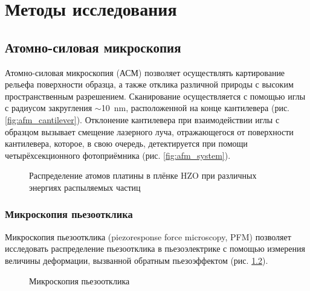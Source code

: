 \chapter{Методы исследования }\label{ch:ch3}

\section{Атомно-силовая микроскопия}\label{sec:ch3/sect1}
Атомно-силовая микроскопия (АСМ) позволяет осуществлять картирование рельефа поверхности образца, а также отклика различной природы с высоким пространственным разрешением. Сканирование осуществляется с помощью иглы с радиусом закругления \(\sim\)\SI{10}{\nm}, расположенной на конце кантилевера (рис. \cref{fig:afm_cantilever}). Отклонение кантилевера при взаимодействии иглы с образцом вызывает смещение лазерного луча, отражающегося от поверхности кантилевера, которое, в свою очередь, детектируется при помощи четырёхсекционного фотоприёмника (рис. \cref{fig:afm_system}).

\begin{figure}[ht]
    \caption[Этот текст попадает в названия рисунков в списке рисунков]{Распределение атомов платины в плёнке HZO  при различных энергиях распыляемых частиц}\label{fig:afm}
\end{figure}

\subsection{Микроскопия пьезоотклика}\label{sec:ch3/sect1/sub1}
Микроскопия пьезоотклика (piezoresponse force microscopy, PFM) позволяет исследовать распределение пьезоотклика в пьезоэлектрике с помощью измерения величины деформации, вызванной обратным пьезоэффектом (рис. \cref{fig:pfm}).

\begin{figure}[ht]
    \caption{Микроскопия пьезоотклика}\label{fig:pfm}
\end{figure}


